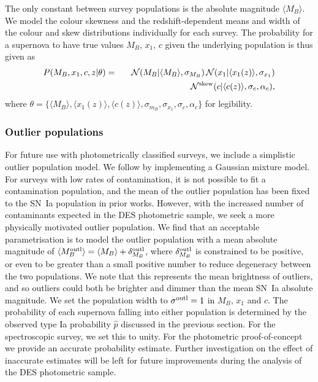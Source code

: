 \documentclass[a4paper,fleqn,usenatbib,manuscript]{emulateapj}
\newcommand{\rubin}{\citetalias{Rubin2015}}
\begin{document}
The only constant between survey populations is the absolute magnitude $\langle M_B \rangle$. We model the colour skewness and the redshift-dependent means and width of the colour and skew distributions individually for each survey. The probability for a supernova to have true values $M_B$, $x_1$, $c$ given the underlying population is thus given as
\begin{eqnarray}
P(M_B, x_1, c, z | \theta) &=& \mathcal{N}(M_B|\langle M_B \rangle, \sigma_{M_B}) \, \mathcal{N}(x_1 | \langle x_1(z) \rangle, \sigma_{x_1})\notag\\ &\quad\quad& \mathcal{N}^{\rm{skew}}(c| \langle c(z) \rangle, \sigma_c, \alpha_c) \label{eq:l1},
\end{eqnarray}
where $\theta = \lbrace \langle M_B \rangle, \langle x_1(z) \rangle, \langle c(z) \rangle, \sigma_{m_B}, \sigma_{x_1}, \sigma_c, \alpha_c \rbrace$ for legibility.

\subsubsection{Outlier populations}

For future use with photometrically classified surveys, we include a simplistic outlier population model. We follow {\rubin} \citep[and therefore ][]{Kunz2007} by implementing a Gaussian mixture model. For surveys with low rates of contamination, it is not possible to fit a contamination population, and the mean of the outlier population has been fixed to the SN~Ia population in prior works. However, with the increased number of contaminants expected in the DES photometric sample, we seek a more physically motivated outlier population.  We find that an acceptable parametrisation is to model the outlier population with a mean absolute magnitude of $\langle M_B^{\rm outl} \rangle = \langle M_B \rangle + \delta_{M_B}^{\rm outl}$, where $\delta_{M_B}^{\rm outl}$ is constrained to be positive, or even to be greater than a small positive number to reduce degeneracy between the two populations.  We note that this represents the mean brightness of outliers, and so outliers could both be brighter and dimmer than the mean SN~Ia absolute magnitude. We set the population width to $\sigma^{\rm outl} = 1$ in $M_B$, $x_1$ and $c$. The probability of each supernova falling into either population is determined by the observed type Ia probability $\hat{p}$ discussed in the previous section. For the spectroscopic survey, we set this to unity. For the photometric proof-of-concept we provide an accurate probability estimate. Further investigation on the effect of inaccurate estimates will be left for future improvements during the analysis of the DES photometric sample.
\end{document}
